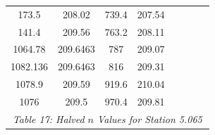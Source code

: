 \begin{center}
\begin{tabular}{|cccc||cc||cc|}
    173.5    & 208.02                   & 739.4 & 207.54                        &        &                                       &          &                                     \\
    141.4    & 209.56                   & 763.2 & 208.11                        &        &                                       &          &                                     \\
    1064.78  & 209.6463                 & 787   & 209.07                        &        &                                       &          &                                     \\
    1082.136 & 209.6463                 & 816   & 209.31                        &        &                                       &          &                                     \\
    1078.9   & 209.59                   & 919.6 & 210.04                        &        &                                       &          &                                     \\
    1076     & 209.5                    & 970.4 & 209.81                        &        &                                       &          &                                     \\
    \hline\multicolumn{8}{c}{\emph{Table 17: Halved $n$ Values for Station 5.065}}
\end{tabular}



\end{center}
